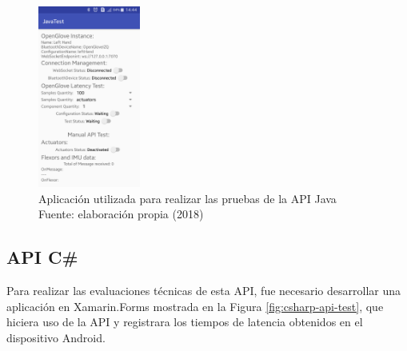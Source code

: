 \begin{figure}
 \begin{center} 
   	\includegraphics[width=0.3\textwidth]{images/chapter05/Java-APITest.png}
   \centering
   \captionsetup{justification=centering}
    \caption[Aplicación utilizada para realizar las pruebas de la API Java ]{Aplicación utilizada para realizar las pruebas de la API Java \\Fuente: elaboración propia (2018)} 
    \label{fig:java-api-test}
  \end{center}
\end{figure}
 
\subsection{API C\#}
Para realizar las evaluaciones técnicas de esta API, fue necesario desarrollar una aplicación en Xamarin.Forms mostrada en la Figura \ref{fig:csharp-api-test}, que hiciera uso de la API y registrara los tiempos de latencia obtenidos en el dispositivo Android.



